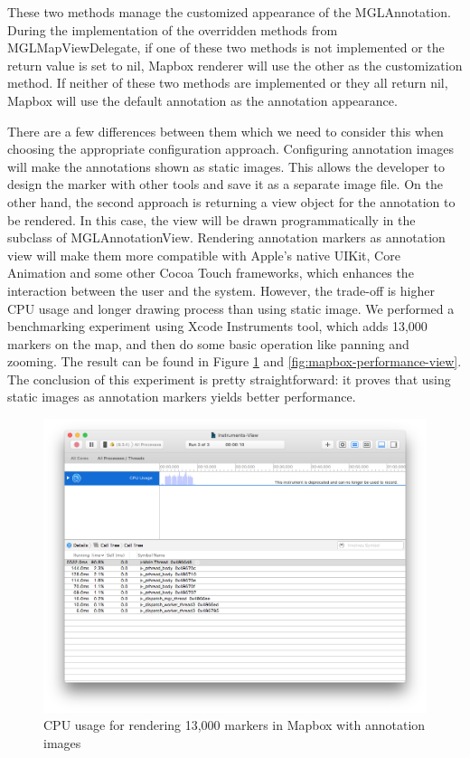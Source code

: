 \documentclass[12pt,a4paper]{article}
\renewcommand\texttt[1]{{\ttfamily\color{textttColor}#1}}
\begin{document}
                These two methods manage the customized appearance of the \texttt{MGLAnnotation}. During the implementation of the overridden methods from \texttt{MGLMapViewDelegate}, if one of these two methods is not implemented or the return value is set to \texttt{nil}, Mapbox renderer will use the other as the customization method. If neither of these two methods are implemented or they all return \texttt{nil}, Mapbox will use the default annotation as the annotation appearance.
                
                There are a few differences between them which we need to consider this when choosing the appropriate configuration approach. Configuring annotation images will make the annotations shown as static images. This allows the developer to design the marker with other tools and save it as a separate image file. On the other hand, the second approach is returning a view object for the annotation to be rendered. In this case, the view will be drawn programmatically in the subclass of \texttt{MGLAnnotationView}. Rendering annotation markers as annotation view will make them more compatible with Apple's native UIKit, Core Animation and some other Cocoa Touch frameworks, which enhances the interaction between the user and the system. However, the trade-off is higher CPU usage and longer drawing process than using static image. We performed a benchmarking experiment using Xcode Instruments tool, which adds 13,000 markers on the map, and then do some basic operation like panning and zooming. The result can be found in Figure \ref{fig:mapbox-performance-image} and \ref{fig:mapbox-performance-view}. The conclusion of this experiment is pretty straightforward: it proves that using static images as annotation markers yields better performance.
                
                \begin{figure}
                    \includegraphics[width=.8\textwidth]{4-1-2-2-x}
                    \centering
                    \caption{CPU usage for rendering 13,000 markers in Mapbox with annotation images}
                    \label{fig:mapbox-performance-image}
                \end{figure}
                
\end{document}
